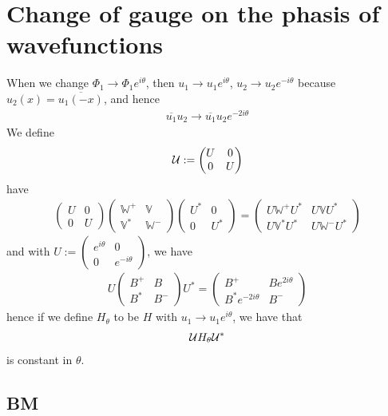 \documentclass[11pt,a4paper,reqno,french,tikz]{amsart}
\newcommand{\mat}[1]{\begin{pmatrix} #1 \end{pmatrix}} %
\newcommand{\bbV}{\mathbb{V}}
\def\bbV{{\mathbb V}}
\def\bbW{{\mathbb W}}
\begin{document}
\section{Change of gauge on the phasis of wavefunctions}%
\label{sec:change_of_gauge_on_the_phasis_of_wavefunctions}

When we change $\Phi_1 \rightarrow \Phi_1 e^{i\theta}$, then $u_1 \rightarrow u_1 e^{i\theta}$, $u_2 \rightarrow u_2 e^{-i\theta}$ because $u_2(x) = \overline{u_1(-x)}$, and hence
\begin{align*}
\boxed{\overline{u_1} u_2 \rightarrow \overline{u_1} u_2 e^{-2i\theta}}
\end{align*}
We define
\begin{align*}
	\cU := \mat{U & 0 \\ 0 & U}
\end{align*}
have
\begin{align*}
	\mat{U & 0 \\ 0 & U} \mat{\bbW^+ & \bbV \\ \bbV^* & \bbW^-}  \mat{U^* & 0 \\ 0 & U^*} = \mat{U\bbW^+ U^* & U\bbV U^*\\ U\bbV^*U^* & U\bbW^-U^*}
\end{align*}
and with $U := \mat{e^{i\theta} & 0 \\  0 & e^{-i\theta}}$, we have
\begin{align*}
	U \mat{B^+ & B \\ B^* & B^-} U^* = \mat{B^+ & B e^{2i\theta} \\ B^* e^{-2i\theta} & B^-}
\end{align*}
hence if we define $H_\theta$ to be $H$ with $u_1 \rightarrow u_1 e^{i\theta}$, we have that
\begin{align*}
\mathcal{U} H_\theta \mathcal{U}^*
\end{align*}
is constant in $\theta$.


\subsection{BM}%
\label{sub:bm}
\end{document}
